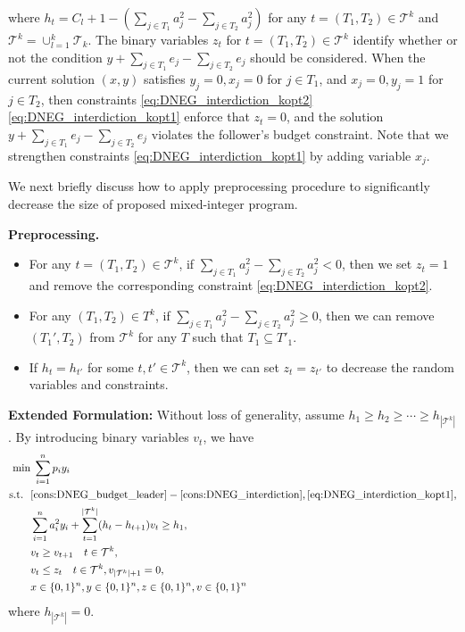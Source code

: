 \documentclass[11pt]{article}
\newcommand{\T}{\mathcal{T}}
\begin{document}
where $h_t = C_l + 1 - (\sum_{j\in T_1} a_j^2 - \sum_{j\in T_2} a_j^2)$ for any $t = (T_1, T_2) \in \T^k$ and $\T^k = \cup_{l=1}^k \T_k$. The binary variables $z_t$ for $t=(T_1, T_2)\in \T^k$ identify whether or not the condition $y + \sum_{j\in T_1}e_j - \sum_{j\in T_2} e_j$ should be considered. When the current solution $(x,y)$ satisfies $y_j=0, x_j = 0$ for $j\in T_1$, and $x_j=0, y_j=1$ for $j\in T_2$, then constraints \eqref{eq:DNEG_interdiction_kopt2}\eqref{eq:DNEG_interdiction_kopt1} enforce that $z_t=0$, and the solution $y + \sum_{j\in T_1}e_j - \sum_{j\in T_2} e_j$ violates the follower's budget constraint. Note that we strengthen constraints \eqref{eq:DNEG_interdiction_kopt1} by adding variable $x_j$.

We next briefly discuss how to apply preprocessing procedure to significantly decrease the size of proposed mixed-integer program.

\noindent\textbf{Preprocessing.}
\begin{itemize}
	\item For any $t=(T_1, T_2)\in \T^k$, if $\sum_{j\in T_1} a_j^2 - \sum_{j\in T_2} a_j^2 < 0$, then we set $z_t = 1$ and remove the corresponding constraint \eqref{eq:DNEG_interdiction_kopt2}.
	\item For any $(T_1, T_2) \in T^k$, if $\sum_{j\in T_1} a_j^2 - \sum_{j\in T_2} a_j^2 \geq 0$, then we can remove $(T_1', T_2)$ from $\T^k$ for any $T$ such that $T_1\subseteq T'_1$.
	\item If $h_t = h_{t'}$ for some $t, t'\in \T^k$, then we can set $z_t = z_{t'}$ to decrease the random variables and constraints.
\end{itemize}




\noindent\textbf{Extended Formulation:} Without loss of generality, assume $h_1 \geq h_2 \geq \cdots \geq h_{|\T^k|}$. By introducing binary variables $v_t$, we have 
\begin{align*}
[\text{EDNeg}_1] ~ \min& \; \sum_{i=1}^n p_iy_i \\
	\text{s.t.~~}& \eqref{cons:DNEG_budget_leader} - \eqref{cons:DNEG_interdiction}, \eqref{eq:DNEG_interdiction_kopt1},\nonumber\\ 
& \sum_{i=1}^n a^2_iy_i + \sum_{t=1}^{|\T^k|} (h_{t} - h_{t+1})v_t \geq h_1, \\
& v_t \geq v_{t+1} \quad t\in \T^k, \\
& v_t \leq z_t \quad t\in \T^k, v_{|\T^k|+1}=0, \\
& x \in \{0, 1\}^n, y\in \{0,1\}^n, z\in \{0,1\}^n, v\in \{0,1\}^n
\end{align*}
where $h_{|\T^k|} = 0$.
\end{document}
